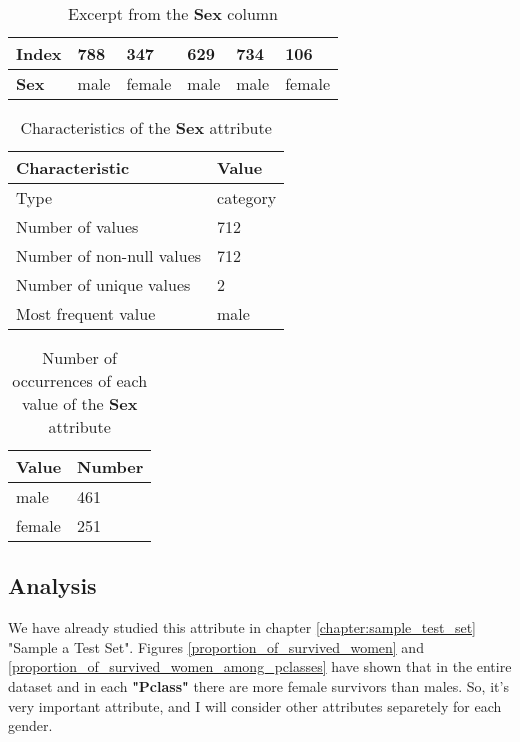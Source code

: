 \begin{table}[!hp]
    \centering
    \caption{Excerpt from the \textbf{Sex} column}
    \begin{tabular}{|l|l|l|l|l|l|}
        \hline
        \textbf{Index} & 788  & 347    & 629  & 734  & 106    \\ \hline
        \textbf{Sex}   & male & female & male & male & female \\ \hline
    \end{tabular}
    \label{table:excerpt_from_sex_column}
\end{table}

\begin{table}[!hp]
    \centering
    \caption{Characteristics of the \textbf{Sex} attribute}
    \begin{tabular}{|l|l|}
        \hline
        \textbf{Characteristic}   & \textbf{Value} \\ \hline
        Type                      & category       \\ \hline
        Number of values          & 712            \\ \hline
        Number of non-null values & 712            \\ \hline
        Number of unique values   & 2              \\ \hline
        Most frequent value       & male           \\ \hline
    \end{tabular}
    \label{table:sex_characteristics}
\end{table}

\begin{table}[!hp]
    \centering
    \caption{Number of occurrences of each value of the \textbf{Sex} attribute}
    \begin{tabular}{|l|l|}
        \hline
        \textbf{Value}  & \textbf{Number} \\ \hline
        male            & 461             \\ \hline
        female          & 251             \\ \hline
    \end{tabular}
    \label{table:sex_value_counts}
\end{table}

\subsection{Analysis}
We have already studied this attribute in chapter \ref{chapter:sample_test_set}
"Sample a Test Set". Figures \ref{proportion_of_survived_women} and 
\ref{proportion_of_survived_women_among_pclasses} have shown that in the 
entire dataset and in each \textbf{"Pclass"} there are more female
survivors than males. So, it's very important attribute, and I will
consider other attributes separetely for each gender.

